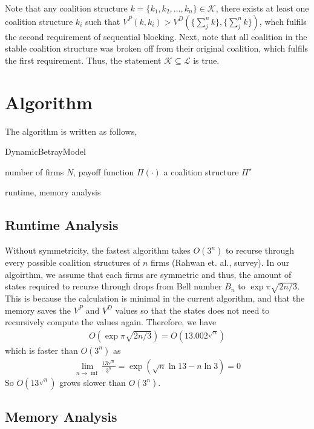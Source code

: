 \documentclass[sigconf,anonymous]{aamas}
\newcommand{\ykc}[1]{{\color{blue} #1}}
\begin{document}
Note that any coalition structure $k=\{k_1, k_2, \dots, k_n\} \in \mathcal{K}$, there exists at least one coalition structure $k_i$ such that $V^P(k, k_i) > V^D(\{\sum_j^n k\}, \{\sum_j^n k\})$, whch fulfils the second requirement of sequential blocking. Next, note that all coalition in the stable coalition structure was broken off from their original coalition, which fulfils the first requirement. Thus, the statement $\mathcal{K} \subseteq \mathcal{L}$ is true. 


\section{Algorithm}
The algorithm is written as follows, 

\begin{algorithm}
	\caption{DynamicBetrayModel}\label{alg:model}
	\begin{algorithmic}[1] %
		\Require number of firms $N$, payoff function $\Pi(\cdot)$
		\Ensure a coalition structure $\Pi^\star$
		\State 
	\end{algorithmic}
\end{algorithm}
\ykc{runtime, memory analysis}


\subsection{Runtime Analysis}
Without symmetricity, the fastest algorithm takes $O(3^n)$ to recurse through every possible coalition structures of $n$ firms (Rahwan et. al., survey). In our algoirthm, we assume that each firms are symmetric and thus, the amount of states required to recurse through drops from Bell number $B_n$ to $\exp{\pi\sqrt{2n/3}}$. This is because the calculation is minimal in the current algorithm, and that the memory saves the $V^P$ and $V^D$ values so that the states does not need to recursively compute the values again. Therefore, we have 
\begin{eqnarray}
	O(\exp{\pi\sqrt{2n/3}}) = O(13.002^{\sqrt{n}})
\end{eqnarray}
which is faster than $O(3^n)$ as 
\begin{eqnarray}
	\lim_{n \to \inf} \frac{13^{\sqrt{n}}}{3^n} = \exp(\sqrt n \ln 13- n\ln 3) = 0
\end{eqnarray}
So $O(13^{\sqrt{n}})$ grows slower than $O(3^n)$. 
\subsection{Memory Analysis} 
\end{document}
